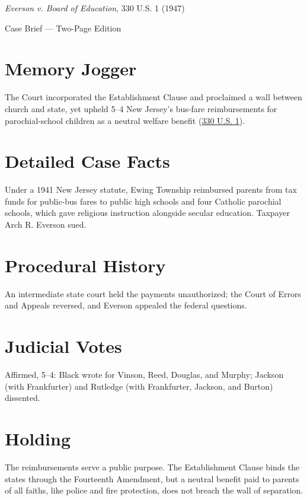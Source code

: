 \documentclass[12pt]{article}
\begin{document}
\begin{center}
{\LARGE \textit{Everson v. Board of Education}, 330 U.S. 1 (1947)\par}
\vspace{0.5em}
{\large Case Brief --- Two-Page Edition\par}
\end{center}

\section{Memory Jogger}
The Court incorporated the Establishment Clause and proclaimed a wall between church and state, yet upheld 5--4 New Jersey's bus-fare reimbursements for parochial-school children as a neutral welfare benefit (\href{https://supreme.justia.com/cases/federal/us/330/1/}{330 U.S. 1}).

\section{Detailed Case Facts}
Under a 1941 New Jersey statute, Ewing Township reimbursed parents from tax funds for public-bus fares to public high schools and four Catholic parochial schools, which gave religious instruction alongside secular education. Taxpayer Arch R. Everson sued.

\section{Procedural History}
An intermediate state court held the payments unauthorized; the Court of Errors and Appeals reversed, and Everson appealed the federal questions.

\section{Judicial Votes}
Affirmed, 5--4: Black wrote for Vinson, Reed, Douglas, and Murphy; Jackson (with Frankfurter) and Rutledge (with Frankfurter, Jackson, and Burton) dissented.

\section{Holding}
The reimbursements serve a public purpose. The Establishment Clause binds the states through the Fourteenth Amendment, but a neutral benefit paid to parents of all faiths, like police and fire protection, does not breach the wall of separation.
\end{document}
